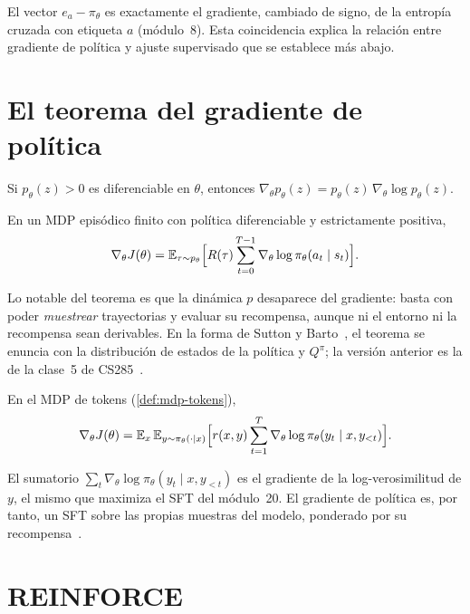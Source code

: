 El vector $e_a-\pi_\theta$ es exactamente el gradiente, cambiado de signo, de la entropía cruzada con etiqueta $a$ (módulo~8). Esta coincidencia explica la relación entre gradiente de política y ajuste supervisado que se establece más abajo.

\section{El teorema del gradiente de política}

\begin{lema}\label{lem:logder}
Si $p_\theta(z)>0$ es diferenciable en $\theta$, entonces $\nabla_\theta p_\theta(z)=p_\theta(z)\,\nabla_\theta\log p_\theta(z)$.
\end{lema}

\begin{teorema}\label{teo:pg}
En un MDP episódico finito con política diferenciable y estrictamente positiva,
\[
\nabla_\theta J(\theta)=\mathbb{E}_{\tau\sim p_\theta}\Bigl[R(\tau)\sum_{t=0}^{T-1}\nabla_\theta\log\pi_\theta(a_t\mid s_t)\Bigr].
\]
\end{teorema}

Lo notable del teorema es que la dinámica $p$ desaparece del gradiente: basta con poder \emph{muestrear} trayectorias y evaluar su recompensa, aunque ni el entorno ni la recompensa sean derivables. En la forma de Sutton y Barto~\cite[§13.2]{sb}, el teorema se enuncia con la distribución de estados de la política y $Q^{\pi}$; la versión anterior es la de la clase~5 de CS285~\cite{cs285}.

\begin{corolario}\label{cor:pg-llm}
En el MDP de tokens (\cref{def:mdp-tokens}),
\[
\nabla_\theta J(\theta)=\mathbb{E}_{x}\,\mathbb{E}_{y\sim\pi_\theta(\cdot\mid x)}\Bigl[r(x,y)\sum_{t=1}^{T}\nabla_\theta\log\pi_\theta(y_t\mid x,y_{<t})\Bigr].
\]
\end{corolario}

El sumatorio $\sum_t\nabla_\theta\log\pi_\theta(y_t\mid x,y_{<t})$ es el gradiente de la log-verosimilitud de $y$, el mismo que maximiza el SFT del módulo~20. El gradiente de política es, por tanto, un SFT sobre las propias muestras del modelo, ponderado por su recompensa~\cite{cs336}.

\section{REINFORCE}

